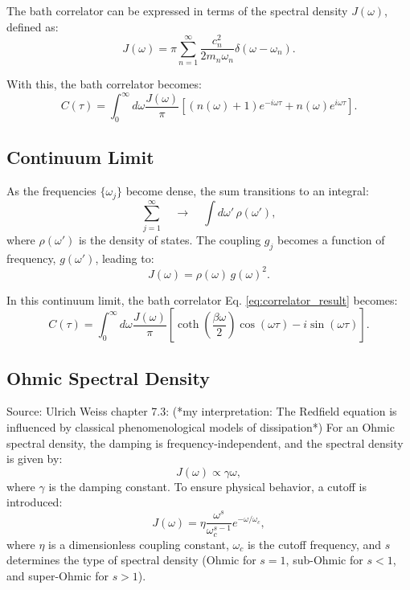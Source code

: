 The bath correlator can be expressed in terms of the spectral density \( J(\omega) \), defined as:
\begin{equation} \label{eq:spectral_density}
J(\omega) = \pi \sum_{n=1}^{\infty} \frac{c_n^2}{2 m_n \omega_n} \delta(\omega - \omega_n).
\end{equation}

With this, the bath correlator becomes:
\begin{equation} \label{eq:correlator_spectral_density}
C(\tau) = \int_0^\infty d\omega \frac{J(\omega)}{\pi} \left[ (n(\omega) + 1) e^{-i \omega \tau} + n(\omega) e^{i \omega \tau} \right].
\end{equation}

\subsection{Continuum Limit}
As the frequencies \( \{\omega_j\} \) become dense, the sum transitions to an integral:
\[
\sum_{j=1}^{\infty} \quad \longrightarrow \quad \int d\omega'\,\rho(\omega'),
\]
where \( \rho(\omega') \) is the density of states. The coupling \( g_j \) becomes a function of frequency, \( g(\omega') \), leading to:
\[
J(\omega) = \rho(\omega)\,g(\omega)^2.
\]

In this continuum limit, the bath correlator Eq. \eqref{eq:correlator_result} becomes:
\begin{equation} \label{eq:correlator_final}
C(\tau) = \int_0^\infty d\omega \frac{J(\omega)}{\pi} \left[ \coth\left( \frac{\beta \omega}{2} \right) \cos(\omega \tau) - i \sin(\omega \tau) \right].
\end{equation}

\subsection{Ohmic Spectral Density}
\label{subsec:ohmic_spectral_density}

Source: Ulrich Weiss chapter 7.3:
(*my interpretation: The Redfield equation is influenced by classical phenomenological models of dissipation*)
For an Ohmic spectral density, the damping is frequency-independent, and the spectral density is given by:
\begin{equation} \label{eq:ohmic_spectral_density}
J(\omega) \propto \gamma \omega,
\end{equation}
where \( \gamma \) is the damping constant. To ensure physical behavior, a cutoff is introduced:
\begin{equation} \label{eq:cutoff_spectral_density}
J(\omega) = \eta \frac{\omega^s}{\omega_c^{s-1}} e^{-\omega / \omega_c},
\end{equation}
where \( \eta \) is a dimensionless coupling constant, \( \omega_c \) is the cutoff frequency, and \( s \) determines the type of spectral density (Ohmic for \( s = 1 \), sub-Ohmic for \( s < 1 \), and super-Ohmic for \( s > 1 \)).
